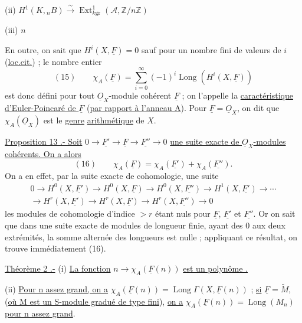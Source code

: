 \noindent (ii) $H^1(K,{}_nB)\xrightarrow{\sim}\operatorname{Ext}^1_{k\mathrm{gr}}(\mathcal A,\mathbb Z/n\mathbb Z)$

\noindent (iii) $n$

En outre, on sait que $H^i(X,\underline F)=0$ sauf pour un nombre fini de valeurs de $i$ (\uline{loc.cit.}) ; le nombre entier
\[
(15)\qquad\chi_A(\underline F)=\sum_{i=0}^{\infty}(-1)^i\operatorname{Long}(H^i(X,\underline F))
\]
est donc défini pour tout $\underline O_X$-module cohérent $\underline F$ ; on l'appelle la \uline{caractéristique d'Euler-Poincaré de $\underline F$} (\uline{par rapport à l'anneau A}).
Pour $\underline F=\underline O_X$, on dit que $\chi_A(\underline O_X)$ est le \uline{genre}  \uline{arithmétique} de $X$.

\uline{Proposition 13 .- Soit} $0\to\underline{F'}\to\underline F\to\underline{F''}\to0$ \uline{une suite exacte de $\underline O_X$-modules cohérents. On a alors}
\[
(16)\qquad\chi_A(\underline F)=\chi_A(\underline{F'})+\chi_A(\underline{F''}).
\]
On a en effet, par la suite exacte de cohomologie, une suite 
\[
\begin{gathered}
0\to H^0(X,\underline{F'})\to H^0(X,\underline F)\to H^0(X,\underline{F''})\to H^1(X,\underline{F'})\to\cdots\\
\to H^r(X,\underline{F'})\to H^r(X,\underline F)\to H^r(X,\underline{F''})\to0
\end{gathered}
\]
 les modules de cohomologie d'indice $>r$ étant nuls pour $\underline F$, $\underline{F'}$ et $\underline{F''}$. Or on sait que dans une suite exacte de modules de longueur finie, ayant des 0 aux deux extrémités, la somme alternée des longueurs est nulle ; appliquant ce résultat, on trouve immédiatement (16).

\uline{Théorème 2 .-} 
(i)  \uline{La fonction} $n\to\chi_A(\underline F(n))$ \uline{est  un polynôme .}

(ii) \uline{Pour n assez grand, on a} $\chi_A(\underline F(n))=\operatorname{Long}\Gamma(X,\underline F(n))$ ; \uline{si} $\underline F=\widetilde M$,  (\uline{où M est un S-module gradué de type fini}), \uline{on a} $\chi_A(\underline F(n))=\operatorname{Long}(M_n)$ \uline{pour n assez grand}.

